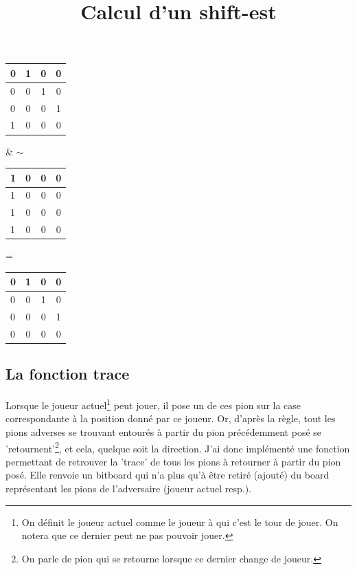 \documentclass{report}
\begin{document}
\begin{center}
\renewcommand{\arraystretch} {1.5}
    \begin{tabular}{|p{0.2cm}|c|c|c|}
        \hline
        0 & 1 & 0 & 0\\
        \hline
        0 & 0 & 1 & 0 \\
        \hline
        0 & 0 & 0 & 1 \\
        \hline
        1 & 0 & 0 & 0 \\
        \hline
    \end{tabular}
    \& $\sim$
    \begin{tabular}{|p{0.2cm}|c|c|c|}
        \hline
        1 & 0 & 0 & 0\\
        \hline
        1 & 0 & 0 & 0 \\
        \hline
        1 & 0 & 0 & 0 \\
        \hline
        1 & 0 & 0 & 0 \\
        \hline
    \end{tabular}
    =
     \begin{tabular}{|p{0.2cm}|c|c|c|}
        \hline
        0 & 1 & 0 & 0\\
        \hline
        0 & 0 & 1 & 0 \\
        \hline
        0 & 0 & 0 & 1 \\
        \hline
        0 & 0 & 0 & 0 \\
        \hline
    \end{tabular}

\end{center}
\begin{center}
        \title{Calcul d'un shift-est}
\end{center}

\subsection{La fonction trace}
Lorsque le joueur actuel\footnote{On définit le joueur actuel comme le joueur à qui c'est le tour de jouer. On notera que ce dernier peut ne pas pouvoir jouer.} peut jouer, il pose un de ces pion sur la case correspondante à la position donné par ce joueur. Or, d’après la règle, tout les pions adverses se trouvant entourés à partir du pion précédemment posé se 'retournent'\footnote{On parle de pion qui se retourne lorsque ce dernier change de joueur.}, et cela, quelque soit la direction.
J’ai donc implémenté une fonction permettant de retrouver la 'trace' de tous les pions à retourner à partir du pion posé. Elle renvoie un bitboard qui n’a plus qu’à être retiré (ajouté) du board représentant les pions de l'adversaire (joueur actuel resp.).\newline
\end{document}
